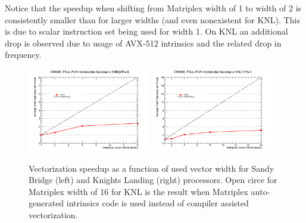 \documentclass{webofc}
\def\twop{0.48\textwidth}
\def\postfigskip{\vskip-4mm}
\begin{document}
Notice that the speedup when shifting from Matriplex width of 1 to width of 2
is consistently smaller than for larger widths (and even nonexistent for
KNL). This is due to scalar instruction set being used for width 1. On KNL
an additional drop is observed due to usage of AVX-512 intrinsics and the
related drop in frequency.

\begin{figure}[htb]
  \centering
  \includegraphics[width=\twop]{figs/comp/SNB_CMSSW_TTbar_PU70_VU_speedup.png}
  \hfill
  \includegraphics[width=\twop]{figs/comp/KNL_CMSSW_TTbar_PU70_VU_speedup.png}
  \postfigskip

  \caption{Vectorization speedup as a function of used vector width for Sandy
    Bridge (left) and Knights Landing (right)
    processors. Open circe for Matriplex width of 16 for KNL is the result
    when Matriplex auto-generated intrinsics code is used instead of compiler
    assisted vectorization.}
  \label{fig:vu-speedup}
\end{figure}
\end{document}
